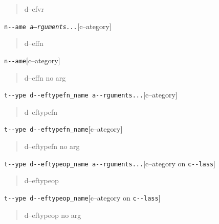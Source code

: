 \documentclass{book}
\begin{document}
\begin{titlepage}
%
\begin{quote}
\unskip{\parskip=0pt\noindent}%
d--efvr
\end{quote}

\noindent\texttt{n{-}{-}ame \EmbracOn{}\textnormal{\textsl{a--rguments...}}\EmbracOff{}}\hfill[c--ategory]



%
\begin{quote}
\unskip{\parskip=0pt\noindent}%
d--effn
\end{quote}

\noindent\texttt{n{-}{-}ame}\hfill[c--ategory]



%
\begin{quote}
\unskip{\parskip=0pt\noindent}%
d--effn no arg
\end{quote}

\noindent\texttt{t{-}{-}ype d{-}{-}eftypefn\_name a{-}{-}rguments...}\hfill[c--ategory]



%
\begin{quote}
\unskip{\parskip=0pt\noindent}%
d--eftypefn
\end{quote}

\noindent\texttt{t{-}{-}ype d{-}{-}eftypefn\_name}\hfill[c--ategory]



%
\begin{quote}
\unskip{\parskip=0pt\noindent}%
d--eftypefn no arg
\end{quote}

\noindent\texttt{t{-}{-}ype d{-}{-}eftypeop\_name a{-}{-}rguments...}\hfill[c--ategory on \texttt{c{-}{-}lass}]



%
\begin{quote}
\unskip{\parskip=0pt\noindent}%
d--eftypeop
\end{quote}

\noindent\texttt{t{-}{-}ype d{-}{-}eftypeop\_name}\hfill[c--ategory on \texttt{c{-}{-}lass}]



%
\begin{quote}
\unskip{\parskip=0pt\noindent}%
d--eftypeop no arg
\end{quote}


\end{titlepage}
\end{document}
